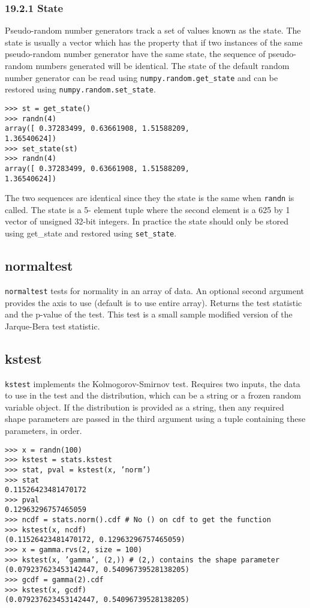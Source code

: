 \documentclass[KSmain.tex]{subfiles}
\begin{document}
\subsubsection{19.2.1 State}
Pseudo-random number generators track a set of values known as the state. The state is usually a vector
which has the property that if two instances of the same pseudo-random number generator have the
same state, the sequence of pseudo-random numbers generated will be identical. The state of the default
random number generator can be read using \texttt{numpy.random.get\_state} and can be restored using
\texttt{numpy.random.set\_state}.
\begin{framed}
\begin{verbatim}>>> st = get_state()
>>> randn(4)
array([ 0.37283499, 0.63661908, 1.51588209,
1.36540624])
>>> set_state(st)
>>> randn(4)
array([ 0.37283499, 0.63661908, 1.51588209,
1.36540624])
\end{verbatim}
\end{framed}
The two sequences are identical since they the state is the same when \texttt{randn} is called. The state is a 5-
element tuple where the second element is a 625 by 1 vector of unsigned 32-bit integers. In practice the
state should only be stored using get_state and restored using \texttt{set\_state}.
\newpage

\subsection{normaltest}
\texttt{normaltest} tests for normality in an array of data. An optional second argument provides the axis to use
(default is to use entire array). Returns the test statistic and the p-value of the test. This test is a small
sample modified version of the Jarque-Bera test statistic.
\subsection{kstest}
\texttt{kstest} implements the Kolmogorov-Smirnov test. Requires two inputs, the data to use in the test and the
distribution, which can be a string or a frozen random variable object. If the distribution is provided as
a string, then any required shape parameters are passed in the third argument using a tuple containing
these parameters, in order.
\begin{verbatim}
>>> x = randn(100)
>>> kstest = stats.kstest
>>> stat, pval = kstest(x, ’norm’)
>>> stat
0.11526423481470172
>>> pval
0.12963296757465059
>>> ncdf = stats.norm().cdf # No () on cdf to get the function
>>> kstest(x, ncdf)
(0.11526423481470172, 0.12963296757465059)
>>> x = gamma.rvs(2, size = 100)
>>> kstest(x, ’gamma’, (2,)) # (2,) contains the shape parameter
(0.079237623453142447, 0.54096739528138205)
>>> gcdf = gamma(2).cdf
>>> kstest(x, gcdf)
(0.079237623453142447, 0.54096739528138205)
\end{verbatim}
\end{document}

